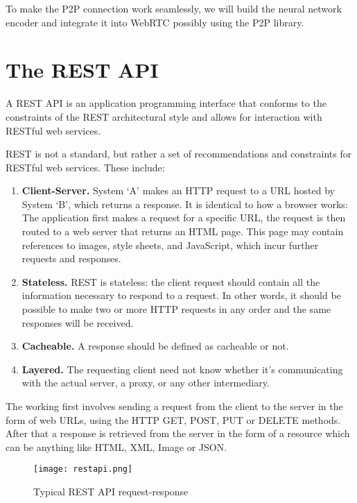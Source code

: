 To make the P2P connection work seamlessly, we will build the neural network encoder and 
integrate it into WebRTC possibly using the P2P library.

\section{The REST API}

A REST API is an application programming interface that conforms to the constraints of the REST 
architectural style and allows for interaction with RESTful web services.

REST is not a standard, but rather a set of recommendations and constraints for 
RESTful web services. These include:

\begin{enumerate}
    \item \textbf{Client-Server.} System ‘A’ makes an HTTP request to a URL hosted by 
    System ‘B’, which returns a response.
    It is identical to how a browser works: The application first makes a request 
    for a specific URL, the request is then routed to a web server that returns an HTML page. 
    This page may contain references to images, style sheets, and JavaScript, 
    which incur further requests and responses.

    \item \textbf{Stateless.} REST is stateless: the client request should contain all the 
    information necessary to respond to a request. In other words, it should be possible to
    make two or more HTTP requests in any order and the same responses will be received.

    \item \textbf{Cacheable.} A response should be defined as cacheable or not.
    
    \item \textbf{Layered.} The requesting client need not know whether it’s communicating 
    with the actual server, a proxy, or any other intermediary.
    
\end{enumerate}

The working first involves sending a request from the client to the server in the form of web URLs, 
using the HTTP GET, POST, PUT or DELETE methods. After that a response is retrieved from the server 
in the form of a resource which can be anything like HTML, XML, Image or JSON.

\begin{figure}
    \begin{center}
        \texttt{[image: restapi.png]}
    \end{center}
    \caption{Typical REST API request-response}
    \label{fig:restapi}
\end{figure}

